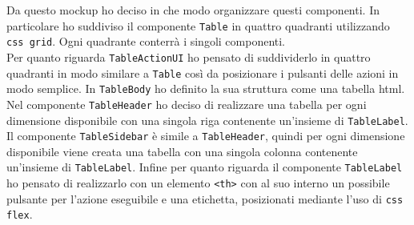\noindent
Da questo mockup ho deciso in che modo organizzare questi componenti. In particolare ho suddiviso il componente \verb|Table| in quattro quadranti utilizzando \verb|css grid|. Ogni quadrante conterrà i singoli componenti. \\
Per quanto riguarda \verb|TableActionUI| ho pensato di suddividerlo in quattro quadranti in modo similare a \verb|Table| così da posizionare i pulsanti delle azioni in modo semplice.
In \verb|TableBody| ho definito la sua struttura come una tabella html.
Nel componente \verb|TableHeader| ho deciso di realizzare una tabella per ogni dimensione disponibile con una singola riga contenente un'insieme di \verb|TableLabel|.
Il componente \verb|TableSidebar| è simile a \verb|TableHeader|, quindi per ogni dimensione disponibile viene creata una tabella con una singola colonna contenente un'insieme di \verb|TableLabel|.
Infine per quanto riguarda il componente \verb|TableLabel| ho pensato di realizzarlo con un elemento \verb|<th>| con al suo interno un possibile pulsante per l'azione eseguibile e una etichetta, posizionati mediante l'uso di \verb|css flex|.














